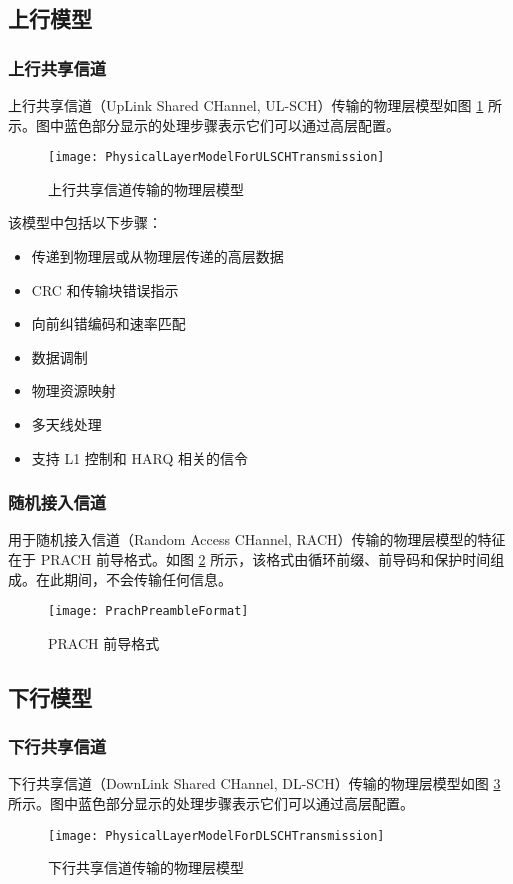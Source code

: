\documentclass[cn,hazy,blue,14pt,screen,device=normal]{elegantnote}
\begin{document}
\subsection{上行模型}
\subsubsection{上行共享信道}
上行共享信道（UpLink Shared CHannel, UL-SCH）传输的物理层模型如图 \ref{PhysicalLayerModelForULSCHTransmission} 所示。图中蓝色部分显示的处理步骤表示它们可以通过高层配置。
\begin{figure}[!htbp]
	\centering
	\texttt{[image: PhysicalLayerModelForULSCHTransmission]}
	\caption{上行共享信道传输的物理层模型}
	\label{PhysicalLayerModelForULSCHTransmission}
\end{figure}

该模型中包括以下步骤：
\begin{itemize}[leftmargin=2cm]
	\item 传递到物理层或从物理层传递的高层数据
	\item CRC 和传输块错误指示
	\item 向前纠错编码和速率匹配
	\item 数据调制
	\item 物理资源映射
	\item 多天线处理
	\item 支持 L1 控制和 HARQ 相关的信令
\end{itemize}

\subsubsection{随机接入信道}
用于随机接入信道（Random Access CHannel, RACH）传输的物理层模型的特征在于 PRACH 前导格式。如图 \ref{PrachPreambleFormat} 所示，该格式由循环前缀、前导码和保护时间组成。在此期间，不会传输任何信息。

\begin{figure}[!htbp]
	\centering
	\texttt{[image: PrachPreambleFormat]}
	\caption{PRACH 前导格式}
	\label{PrachPreambleFormat}
\end{figure}

\subsection{下行模型}
\subsubsection{下行共享信道}
下行共享信道（DownLink Shared CHannel, DL-SCH）传输的物理层模型如图 \ref{PhysicalLayerModelForDLSCHTransmission} 所示。图中蓝色部分显示的处理步骤表示它们可以通过高层配置。
\begin{figure}[!htbp]
	\centering
	\texttt{[image: PhysicalLayerModelForDLSCHTransmission]}
	\caption{下行共享信道传输的物理层模型}
	\label{PhysicalLayerModelForDLSCHTransmission}
\end{figure}
\end{document}
